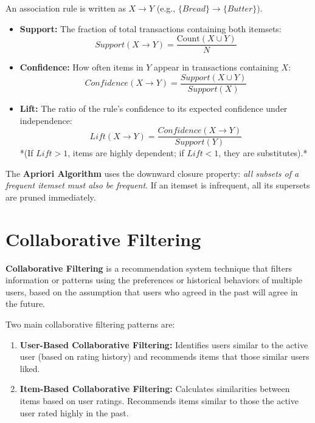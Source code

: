 \documentclass[12pt,a4paper]{article}
\begin{document}
\begin{tcolorbox}[formulabox, title={Association Rule Metrics}]
  An association rule is written as $X \rightarrow Y$ (e.g., $\{Bread\} \rightarrow \{Butter\}$).
  \begin{itemize}[leftmargin=*, itemsep=3pt]
    \item \textbf{Support:} The fraction of total transactions containing both itemsets:
      $$Support(X \rightarrow Y) = \frac{\text{Count}(X \cup Y)}{N}$$
    \item \textbf{Confidence:} How often items in $Y$ appear in transactions containing $X$:
      $$Confidence(X \rightarrow Y) = \frac{Support(X \cup Y)}{Support(X)}$$
    \item \textbf{Lift:} The ratio of the rule's confidence to its expected confidence under independence:
      $$Lift(X \rightarrow Y) = \frac{Confidence(X \rightarrow Y)}{Support(Y)}$$
      *(If $Lift > 1$, items are highly dependent; if $Lift < 1$, they are substitutes).*
  \end{itemize}
\end{tcolorbox}

The \textbf{Apriori Algorithm} uses the downward closure property: \textit{all subsets of a frequent itemset must also be frequent}. If an itemset is infrequent, all its supersets are pruned immediately.

\section{Collaborative Filtering}

\begin{tcolorbox}[defbox, title={Collaborative Filtering}]
  \textbf{Collaborative Filtering} is a recommendation system technique that filters information or patterns using the preferences or historical behaviors of multiple users, based on the assumption that users who agreed in the past will agree in the future.
\end{tcolorbox}

Two main collaborative filtering patterns are:
\begin{enumerate}[leftmargin=*, itemsep=3pt]
  \item \textbf{User-Based Collaborative Filtering:} Identifies users similar to the active user (based on rating history) and recommends items that those similar users liked.
  \item \textbf{Item-Based Collaborative Filtering:} Calculates similarities between items based on user ratings. Recommends items similar to those the active user rated highly in the past.
\end{enumerate}
\end{document}
